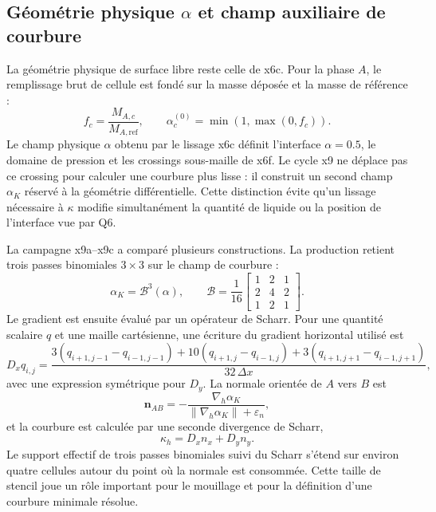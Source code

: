 \documentclass[11pt,a4paper]{article}
\begin{document}
\subsection{Géométrie physique $\alpha$ et champ auxiliaire de courbure}

La géométrie physique de surface libre reste celle de x6c. Pour la phase $A$, le remplissage brut de cellule est fondé sur la masse déposée et la masse de référence :
\begin{equation}
  f_c=\frac{M_{A,c}}{M_{A,\mathrm{ref}}},
  \qquad
  \alpha^{(0)}_c=\min(1,\max(0,f_c)).
\end{equation}
Le champ physique $\alpha$ obtenu par le lissage x6c définit l'interface $\alpha=0.5$, le domaine de pression et les crossings sous-maille de x6f. Le cycle x9 ne déplace pas ce crossing pour calculer une courbure plus lisse : il construit un second champ $\alpha_K$ réservé à la géométrie différentielle. Cette distinction évite qu'un lissage nécessaire à $\kappa$ modifie simultanément la quantité de liquide ou la position de l'interface vue par Q6.

La campagne x9a--x9c a comparé plusieurs constructions. La production retient trois passes binomiales $3\times3$ sur le champ de courbure :
\begin{equation}
  \alpha_K = \mathcal{B}^3(\alpha),
  \qquad
  \mathcal{B}=\frac1{16}
  \begin{bmatrix}
  1&2&1\\
  2&4&2\\
  1&2&1
  \end{bmatrix}.
\end{equation}
Le gradient est ensuite évalué par un opérateur de Scharr. Pour une quantité scalaire $q$ et une maille cartésienne, une écriture du gradient horizontal utilisé est
\begin{equation}
 D_x q_{i,j}=\frac{
 3(q_{i+1,j-1}-q_{i-1,j-1})+
 10(q_{i+1,j}-q_{i-1,j})+
 3(q_{i+1,j+1}-q_{i-1,j+1})}
 {32\,\Delta x},
\end{equation}
avec une expression symétrique pour $D_y$. La normale orientée de $A$ vers $B$ est
\begin{equation}
  \bm n_{AB}=-\frac{\nabla_h\alpha_K}
  {\lVert\nabla_h\alpha_K\rVert+\varepsilon_n},
  \label{eq:x9_normal}
\end{equation}
et la courbure est calculée par une seconde divergence de Scharr,
\begin{equation}
  \kappa_h=D_x n_x+D_y n_y.
  \label{eq:x9_curvature}
\end{equation}
Le support effectif de trois passes binomiales suivi du Scharr s'étend sur environ quatre cellules autour du point où la normale est consommée. Cette taille de stencil joue un rôle important pour le mouillage et pour la définition d'une courbure minimale résolue.
\end{document}
